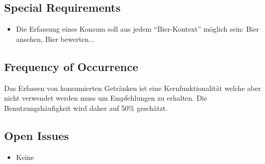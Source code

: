\documentclass[10pt,a4paper]{scrartcl}
\begin{document}
\subsection*{Special Requirements}

\begin{itemize}
\item Die Erfassung eines Konsum soll aus jedem ``Bier-Kontext'' möglich sein: Bier ansehen, Bier bewerten...
\end{itemize}



\subsection*{Frequency of Occurrence}

Das Erfassen von konsumierten Getränken ist eine Kernfunktionalität welche aber nicht verwendet werden muss um Empfehlungen zu erhalten. Die Benutzungshäufigkeit wird daher auf 50\% geschätzt.

\subsection*{Open Issues}

\begin{itemize}
\item Keine
\end{itemize}
\end{document}
